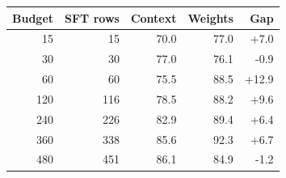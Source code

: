 \begin{tabular}{rrrrr}\toprule
Budget & SFT rows & Context & Weights & Gap \\\midrule
15 & 15 & 70.0 & 77.0 & +7.0 \\
30 & 30 & 77.0 & 76.1 & -0.9 \\
60 & 60 & 75.5 & 88.5 & +12.9 \\
120 & 116 & 78.5 & 88.2 & +9.6 \\
240 & 226 & 82.9 & 89.4 & +6.4 \\
360 & 338 & 85.6 & 92.3 & +6.7 \\
480 & 451 & 86.1 & 84.9 & -1.2 \\
\bottomrule\end{tabular}
